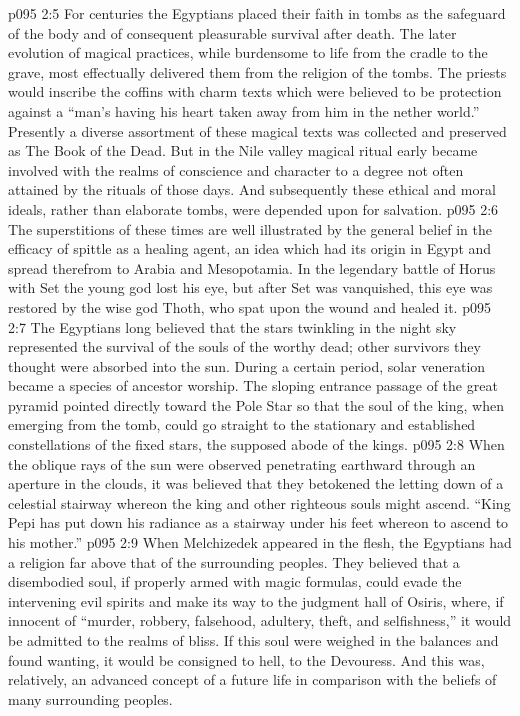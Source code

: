 \vs p095 2:5 For centuries the Egyptians placed their faith in tombs as the safeguard of the body and of consequent pleasurable survival after death. The later evolution of magical practices, while burdensome to life from the cradle to the grave, most effectually delivered them from the religion of the tombs. The priests would inscribe the coffins with charm texts which were believed to be protection against a “man’s having his heart taken away from him in the nether world.” Presently a diverse assortment of these magical texts was collected and preserved as The Book of the Dead. But in the Nile valley magical ritual early became involved with the realms of conscience and character to a degree not often attained by the rituals of those days. And subsequently these ethical and moral ideals, rather than elaborate tombs, were depended upon for salvation.
\pc \vs p095 2:6 The superstitions of these times are well illustrated by the general belief in the efficacy of spittle as a healing agent, an idea which had its origin in Egypt and spread therefrom to Arabia and Mesopotamia. In the legendary battle of Horus with Set the young god lost his eye, but after Set was vanquished, this eye was restored by the wise god Thoth, who spat upon the wound and healed it.
\pc \vs p095 2:7 The Egyptians long believed that the stars twinkling in the night sky represented the survival of the souls of the worthy dead; other survivors they thought were absorbed into the sun. During a certain period, solar veneration became a species of ancestor worship. The sloping entrance passage of the great pyramid pointed directly toward the Pole Star so that the soul of the king, when emerging from the tomb, could go straight to the stationary and established constellations of the fixed stars, the supposed abode of the kings.
\vs p095 2:8 When the oblique rays of the sun were observed penetrating earthward through an aperture in the clouds, it was believed that they betokened the letting down of a celestial stairway whereon the king and other righteous souls might ascend. “King Pepi has put down his radiance as a stairway under his feet whereon to ascend to his mother.”
\vs p095 2:9 When Melchizedek appeared in the flesh, the Egyptians had a religion far above that of the surrounding peoples. They believed that a disembodied soul, if properly armed with magic formulas, could evade the intervening evil spirits and make its way to the judgment hall of Osiris, where, if innocent of “murder, robbery, falsehood, adultery, theft, and selfishness,” it would be admitted to the realms of bliss. If this soul were weighed in the balances and found wanting, it would be consigned to hell, to the Devouress. And this was, relatively, an advanced concept of a future life in comparison with the beliefs of many surrounding peoples.

